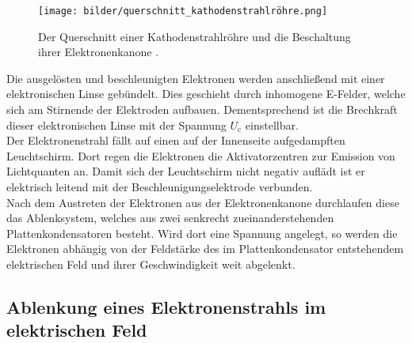     \begin{figure}[H]
        \centering
        \texttt{[image: bilder/querschnitt\_kathodenstrahlröhre.png]}
        \caption{Der Querschnitt einer Kathodenstrahlröhre und die Beschaltung ihrer Elektronenkanone \cite{anleitung501}.}
        \label{fig:querschnitt_kathodenstrahlroehre}
    \end{figure}

    \noindent Die ausgelösten und beschleunigten Elektronen werden anschließend mit einer elektronischen Linse gebündelt. Dies geschieht durch inhomogene E-Felder, 
    welche sich am Stirnende der Elektroden aufbauen. Dementsprechend ist die Brechkraft dieser elektronischen Linse mit der Spannung $U_{\text{c}}$ einstellbar.\\
    Der Elektronenstrahl fällt auf einen auf der Innenseite aufgedampften Leuchtschirm. Dort regen die Elektronen die Aktivatorzentren zur Emission von
    Lichtquanten an. Damit sich der Leuchtschirm nicht negativ auflädt ist er elektrisch leitend mit der Beschleunigungselektrode verbunden. \\
    Nach dem Austreten der Elektronen aus der Elektronenkanone durchlaufen diese das Ablenksystem, welches aus zwei senkrecht zueinanderstehenden
    Plattenkondensatoren besteht. Wird dort eine Spannung angelegt, so werden die Elektronen abhängig von der Feldstärke des im Plattenkondensator entstehendem 
    elektrischen Feld und ihrer Geschwindigkeit weit abgelenkt. 

\subsection{Ablenkung eines Elektronenstrahls im elektrischen Feld}

